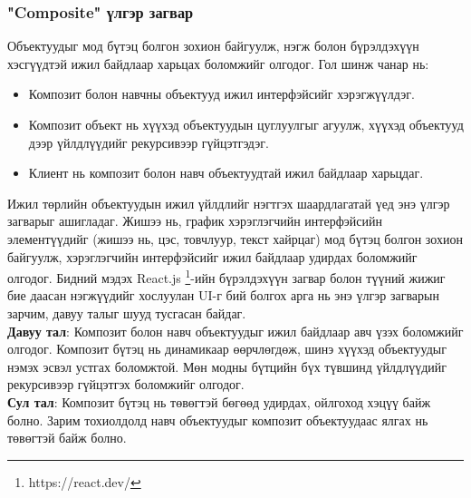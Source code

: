 \subsubsection{"Composite" үлгэр загвар}
\quad \quad Объектуудыг мод бүтэц болгон зохион байгуулж,	 нэгж болон бүрэлдэхүүн хэсгүүдтэй ижил байдлаар харьцах боломжийг олгодог. Гол шинж чанар нь:
\begin{itemize}
	\item Композит болон навчны объектууд ижил интерфэйсийг хэрэгжүүлдэг.
	\item Композит объект нь хүүхэд объектуудын цуглуулгыг агуулж, хүүхэд объектууд дээр үйлдлүүдийг рекурсивээр гүйцэтгэдэг.
	\item Клиент нь композит болон навч объектуудтай ижил байдлаар харьцдаг.
\end{itemize}
Ижил төрлийн объектуудын ижил үйлдлийг нэгтгэх шаардлагатай үед энэ үлгэр загварыг ашигладаг. Жишээ нь, график хэрэглэгчийн интерфэйсийн элементүүдийг (жишээ нь, цэс, товчлуур, текст хайрцаг) мод бүтэц болгон зохион байгуулж, хэрэглэгчийн интерфэйсийг ижил байдлаар удирдах боломжийг олгодог. Бидний мэдэх React.js \footnote{https://react.dev/}-ийн бүрэлдэхүүн загвар болон түүний жижиг бие даасан нэгжүүдийг хослуулан UI-г бий болгох арга нь энэ үлгэр загварын зарчим, давуу талыг шууд тусгасан байдаг.\\	
\textbf{Давуу тал}: Композит болон навч объектуудыг ижил байдлаар авч үзэх боломжийг олгодог. Композит бүтэц нь динамикаар өөрчлөгдөж, шинэ хүүхэд объектуудыг нэмэх эсвэл устгах боломжтой. Мөн модны бүтцийн бүх түвшинд үйлдлүүдийг рекурсивээр гүйцэтгэх боломжийг олгодог.\\
\textbf{Сул тал}: Композит бүтэц нь төвөгтэй бөгөөд удирдах, ойлгоход хэцүү байж болно. Зарим тохиолдолд навч объектуудыг композит объектуудаас ялгах нь төвөгтэй байж болно.


